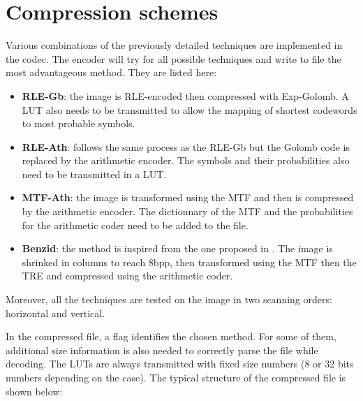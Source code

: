 \vspace*{-0.4cm}
\section{Compression schemes}

Various combinations of the previously detailed techniques are implemented in the codec. The encoder will try for all possible techniques and write to file the most advantageous method. They are listed here:

\begin{itemize}
	\item \textbf{RLE-Gb}: the image is RLE-encoded then compressed with Exp-Golomb. A LUT also needs to be transmitted to allow the mapping of shortest codewords to most probable symbols.
	
	\item \textbf{RLE-Ath}: follows the same process as the RLE-Gb but the Golomb code is replaced by the arithmetic encoder. The symbols and their probabilities also need to be transmitted in a LUT.
	
	\item \textbf{MTF-Ath}: the image is transformed using the MTF and then is compressed by the arithmetic encoder. The dictionnary of the MTF and the probabilities for the arithmetic coder need to be added to the file.
	
	\item \textbf{Benzid}: the method is inspired from the one proposed in \cite{benzid}. The image is shrinked in columns to reach 8bpp, then transformed using the MTF then the TRE and compressed using the arithmetic coder.
\end{itemize}

Moreover, all the techniques are tested on the image in two scanning orders: horizontal and vertical.

In the compressed file, a flag identifies the chosen method. For some of them, additional size information is also needed to correctly parse the file while decoding. The LUTs are always transmitted with fixed size numbers (8 or 32 bits numbers depending on the case). The typical structure of the compressed file is shown below:

